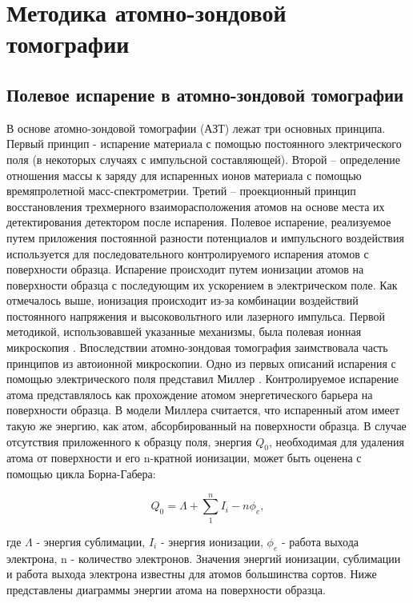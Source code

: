 \chapter{Методика атомно-зондовой томографии}\label{ch:ch1}



\section{Полевое испарение в атомно-зондовой томографии}\label{sec:ch1/sec1}

В основе атомно-зондовой томографии (АЗТ) лежат три основных принципа. Первый принцип - испарение материала с помощью постоянного электрического поля (в некоторых случаях с импульсной составляющей). Второй – определение отношения массы к заряду для испаренных ионов материала с помощью времяпролетной масс-спектрометрии. Третий – проекционный принцип восстановления трехмерного взаиморасположения атомов на основе места их детектирования детектором после испарения.  Полевое испарение, реализуемое путем приложения постоянной разности потенциалов и импульсного воздействия используется для последовательного контролируемого испарения атомов с поверхности образца. Испарение происходит путем ионизации атомов на поверхности образца с последующим их ускорением в электрическом поле. Как отмечалось выше, ионизация происходит из-за комбинации воздействий постоянного напряжения и высоковольтного или лазерного импульса. Первой методикой, использовавшей указанные механизмы, была полевая ионная микроскопия \cite{Muller60}. Впоследствии атомно-зондовая томография заимствовала часть принципов из автоионной микроскопии. Одно из первых описаний испарения с помощью электрического поля представил Миллер \cite{Muller56}. Контролируемое испарение атома представлялось как прохождение атомом энергетического барьера на поверхности образца. В модели Миллера считается, что испаренный атом имеет такую же энергию, как атом, абсорбированный на поверхности образца. В случае отсутствия приложенного к образцу поля, энергия $Q_0$, необходимая для удаления атома от поверхности и его n-кратной ионизации, может быть оценена с помощью цикла Борна-Габера:

\begin{equation}
	\label{eq:equation1}
	Q_0 = \Lambda + \sum_{1}^{n} I_i -n\phi_e,
\end{equation}

где $\Lambda$ - энергия сублимации, $I_i$ - энергия ионизации, $\phi_e$ - работа выхода электрона, n - количество электронов. Значения энергий ионизации, сублимации и работа выхода электрона известны для атомов большинства сортов. Ниже представлены диаграммы энергии атома на поверхности образца.

